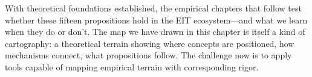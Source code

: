 \documentclass[../main.tex]{subfiles}
\begin{document}
\vspace{1em}

With theoretical foundations established, the empirical chapters that follow test whether these fifteen propositions hold in the EIT ecosystem---and what we learn when they do or don't. The map we have drawn in this chapter is itself a kind of cartography: a theoretical terrain showing where concepts are positioned, how mechanisms connect, what propositions follow. The challenge now is to apply tools capable of mapping empirical terrain with corresponding rigor.
\end{document}
